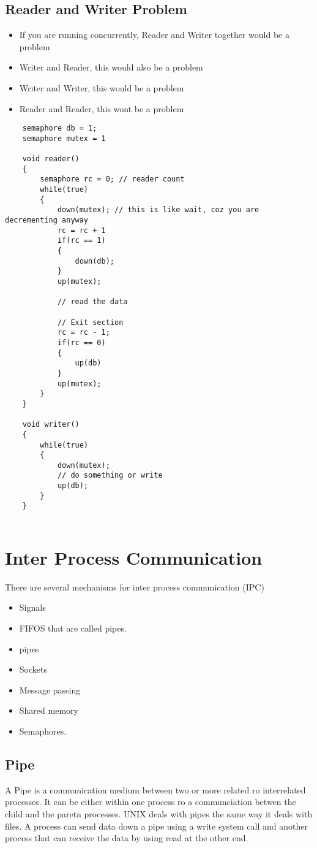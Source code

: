 \documentclass[11pt]{article}
\begin{document}
\subsection{Reader and Writer Problem}

\begin{itemize}
	\item If you are running concurrently, Reader and Writer together would be a problem
	\item Writer and Reader, this would also be a problem
	\item Writer and Writer, this would be a problem
	\item Reader and Reader, this wont be a problem
\end{itemize}

\begin{lstlisting}
	semaphore db = 1;
	semaphore mutex = 1

	void reader()
	{
		semaphore rc = 0; // reader count
		while(true)
		{
			down(mutex); // this is like wait, coz you are decrementing anyway
			rc = rc + 1
			if(rc == 1)
			{
				down(db);
			}
			up(mutex);
			
			// read the data 
			
			// Exit section
			rc = rc - 1;
			if(rc == 0)
			{
				up(db)
			}
			up(mutex);
		}
	}

	void writer()
	{
		while(true)
		{
			down(mutex);
			// do something or write
			up(db);
		}
	}


\end{lstlisting}

\section{Inter Process Communication}
There are several mechanisms for inter process communication (IPC)
\begin{itemize}
	\item Signals
	\item FIFOS that are called pipes. 
	\item pipes
	\item Sockets
	\item Message passing
	\item Shared memory
	\item Semaphores. 
\end{itemize}

\subsection{Pipe}
A Pipe is a communication medium between two or more related ro interrelated processes. It can be either within one process ro a communciation betwen the child and the paretn processes.
UNIX deals with pipes the same way it deals with files. A process can send data down a pipe using a write system call and another process that can receive the data by using read at the other end.  
\end{document}
